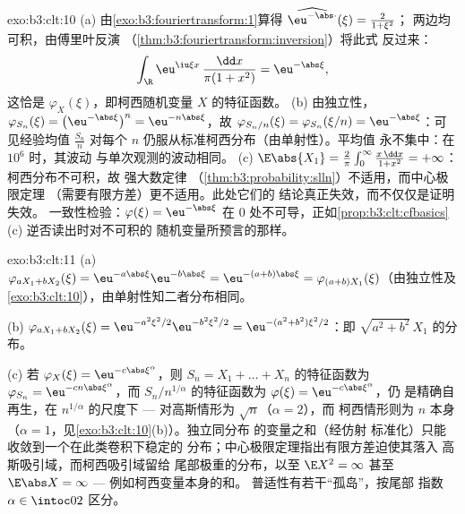 \begin{solution}{exo:b3:clt:10}
(a) 由\cref{exo:b3:fouriertransform:1}算得
$\widehat{\eu^{-\abs\cdot}}(\xi) = \frac{2}{1 + \xi^2}$；
两边均可积，由傅里叶反演
（\cref{thm:b3:fouriertransform:inversion}）将此式
反过来：
\[
\int_\R\eu^{\iu\xi x}\,\frac{\dd x}{\pi(1 + x^2)} =
\eu^{-\abs\xi},
\]
这恰是 $\varphi_X(\xi)$，即柯西随机变量 $X$ 的特征函数。
(b) 由独立性，$\varphi_{S_n}(\xi) =
\bigl(\eu^{-\abs\xi}\bigr)^n = \eu^{-n\abs\xi}$，故
$\varphi_{S_n/n}(\xi) = \varphi_{S_n}(\xi/n) =
\eu^{-\abs\xi}$：可见经验均值 $\frac{S_n}n$
对每个 $n$ 仍服从标准柯西分布（由单射性）。平均值
永不集中：在 $10^6$ 时，其波动
与单次观测的波动相同。
(c) $\E\abs{X_1} = \frac2\pi\int_0^\infty\frac{x\,\dd x}{1 +
x^2} = +\infty$：柯西分布不可积，故
强大数定律
（\cref{thm:b3:probability:slln}）不适用，而中心极限定理
（需要有限方差）更不适用。此处它们的
结论真正失效，而不仅仅是证明失效。
一致性检验：$\varphi(\xi) = \eu^{-\abs\xi}$ 在
$0$ 处不可导，正如\cref{prop:b3:clt:cfbasics}(c)
逆否读出时对不可积的
随机变量所预言的那样。
\end{solution}

\begin{solution}{exo:b3:clt:11}
(a) $\varphi_{aX_1 + bX_2}(\xi) =
\eu^{-a\abs\xi}\eu^{-b\abs\xi} = \eu^{-(a+b)\abs\xi} =
\varphi_{(a+b)X_1}(\xi)$（由独立性及
\cref{exo:b3:clt:10}），由单射性知二者分布相同。

(b) $\varphi_{aX_1+bX_2}(\xi) = \eu^{-a^2\xi^2/2}
\eu^{-b^2\xi^2/2} = \eu^{-(a^2+b^2)\xi^2/2}$：即
$\sqrt{a^2+b^2}\,X_1$ 的分布。

(c) 若 $\varphi_X(\xi) = \eu^{-c\abs\xi^\alpha}$，则
$S_n = X_1 + \dots + X_n$ 的特征函数为 $\varphi_{S_n} =
\eu^{-cn\abs\xi^\alpha}$，而 $S_n/n^{1/\alpha}$ 的特征函数为
$\varphi(\xi) = \eu^{-c\abs\xi^\alpha}$，仍
是精确自再生，在 $n^{1/\alpha}$ 的尺度下 ---
对高斯情形为 $\sqrt n$（$\alpha = 2$），而
柯西情形则为 $n$ 本身（$\alpha = 1$，见\cref{exo:b3:clt:10}(b)）。独立同分布
的变量之和（经仿射
标准化）只能收敛到一个在此类卷积下稳定的
分布；中心极限定理指出有限方差迫使其落入
高斯吸引域，而柯西吸引域留给
尾部极重的分布，以至 $\E X^2 = \infty$ 甚至 $\E\abs
X = \infty$ --- 例如柯西变量本身的和。
普适性有若干“孤岛”，按尾部
指数 $\alpha \in \intoc02$ 区分。
\end{solution}

